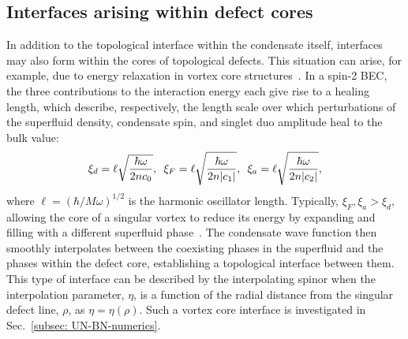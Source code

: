 \subsection{Interfaces arising within defect cores}
In addition to the topological interface within the condensate itself,
interfaces may also form within the cores of topological defects.
This situation can arise, for example, due to energy relaxation in vortex core
structures~\cite{Ruostekoski2003,Lovegrove2012,Lovegrove2016,Borgh2016,
    Borgh2016a, Weiss2019,Xiao2021,Xiao2022}.
In a spin-2 BEC, the three contributions to the interaction energy each give
rise to a healing length, which describe, respectively, the length scale over
which perturbations of the superfluid density, condensate spin, and singlet duo
amplitude heal to the bulk value:
\begin{equation}
    \xi_d=\ell \sqrt{\frac{\hbar\omega}{2nc_0}},
    \enskip \xi_F=\ell \sqrt{\frac{\hbar\omega}{2n|c_1|}},
    \enskip \xi_a=\ell \sqrt{\frac{\hbar\omega}{2n|c_2|}},
    \label{eq: spin-2-healing-lengths}
\end{equation}
where \(\ell = {(\hbar/M\omega)}^{1/2}\) is the harmonic oscillator length.
Typically, \(\xi_F,\xi_a > \xi_d\), allowing the core of a singular vortex
to reduce its energy by expanding and filling with a different superfluid
phase~\cite{Ruostekoski2003}.
The condensate wave function then smoothly interpolates between the coexisting
phases in the superfluid and the phases within the defect core, establishing a
topological interface between them.
This type of interface can be described by the interpolating spinor when the
interpolation parameter, \(\eta\), is a function of the radial distance from the
singular defect line, \(\rho\), as \(\eta=\eta(\rho)\).
Such a vortex core interface is investigated in
Sec.~\ref{subsec: UN-BN-numerics}.


